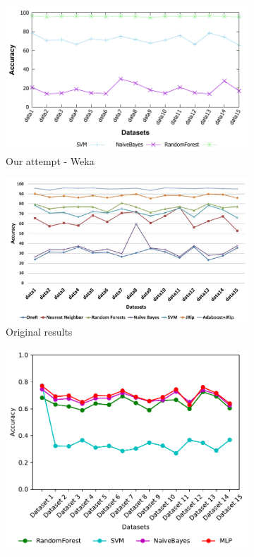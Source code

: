 \begin{figure}[H]
    \centering
    \begin{subfigure}[t]{0.4\textwidth}
        \includegraphics[width=\linewidth]{images/weka_accuracy3}
        \caption{Our attempt - Weka}
    \end{subfigure}%
    \begin{subfigure}[t]{0.4\textwidth}
        \includegraphics[width=\linewidth]{images/weka_accuracy3_cite.png}
        \caption{Original results \cite{borges_hink_machine_2014-1}}
    \end{subfigure}
    \begin{subfigure}[t]{0.4\textwidth}
        \includegraphics[width=\linewidth, page = 2]{images/accuracy}

\end{subfigure}
\end{figure}

